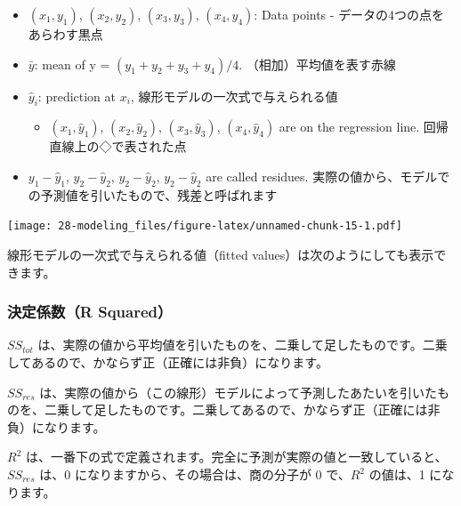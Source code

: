 \documentclass[
  xelatex, ja=standard]{bxjsbook}
\newenvironment{Shaded}{\begin{snugshade}}{\end{snugshade}}
\newcommand{\CommentTok}[1]{\textcolor[rgb]{0.56,0.35,0.01}{\textit{#1}}}
\newcommand{\NormalTok}[1]{#1}
\newcommand{\SpecialCharTok}[1]{\textcolor[rgb]{0.81,0.36,0.00}{\textbf{#1}}}
\providecommand{\tightlist}{%
  \setlength{\itemsep}{0pt}\setlength{\parskip}{0pt}}
\theoremstyle{definition}
\theoremstyle{definition}
\theoremstyle{definition}
\theoremstyle{definition}
\theoremstyle{remark}
\begin{document}
\begin{itemize}
\tightlist
\item
  \((x_1, y_1)\), \((x_2,y_2)\), \((x_3, y_3)\), \((x_4, y_4)\): Data points - データの4つの点をあらわす黒点
\item
  \(\bar{y}\): mean of y = \((y_1 + y_2 + y_3 + y_4)/4\). （相加）平均値を表す赤線
\item
  \(\hat{y}_i\): prediction at \(x_i\), 線形モデルの一次式で与えられる値

  \begin{itemize}
  \tightlist
  \item
    \((x_1, \hat{y}_1)\), \((x_2, \hat{y}_2)\), \((x_3, \hat{y}_3)\), \((x_4, \hat{y}_4)\) are on the regression line. 回帰直線上の◇で表された点
  \end{itemize}
\item
  \(y_1-\hat{y}_1\), \(y_2-\hat{y}_2\), \(y_2-\hat{y}_2\), \(y_2-\hat{y}_2\) are called residues. 実際の値から、モデルでの予測値を引いたもので、残差と呼ばれます
\end{itemize}

\texttt{[image: 28-modeling\_files/figure-latex/unnamed-chunk-15-1.pdf]}

線形モデルの一次式で与えられる値（fitted values）は次のようにしても表示できます。

\begin{Shaded}
\end{Shaded}

\hypertarget{ux6c7aux5b9aux4fc2ux6570r-squared-1}{%
\subsubsection{決定係数（R Squared）}\label{ux6c7aux5b9aux4fc2ux6570r-squared-1}}

\(SS_{tot}\) は、実際の値から平均値を引いたものを、二乗して足したものです。二乗してあるので、かならず正（正確には非負）になります。

\(SS_{res}\) は、実際の値から（この線形）モデルによって予測したあたいを引いたものを、二乗して足したものです。二乗してあるので、かならず正（正確には非負）になります。

\(R^2\) は、一番下の式で定義されます。完全に予測が実際の値と一致していると、\(SS_{res}\) は、0 になりますから、その場合は、商の分子が 0 で、\(R^2\) の値は、1 になります。
\end{document}
